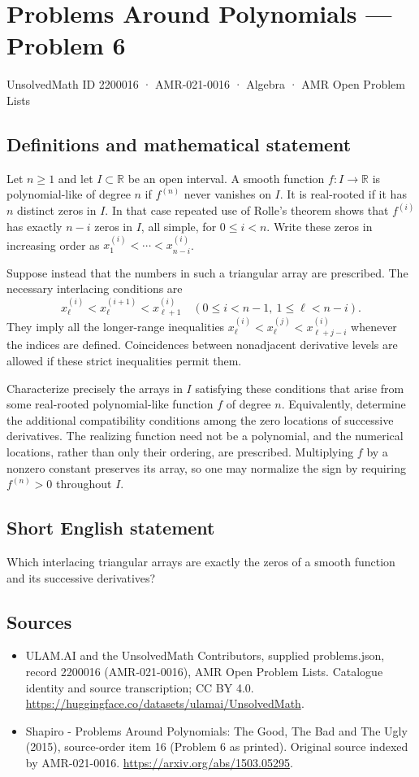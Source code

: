 \documentclass[11pt,a4paper]{article}
\begin{document}
\section*{Problems Around Polynomials — Problem 6}\label{2200016}
{\small UnsolvedMath ID 2200016 · AMR-021-0016 · Algebra · AMR Open Problem Lists}
\subsection{Definitions and mathematical statement}
Let $n\geq1$ and let $I\subset\mathbb R$ be an open interval.
A smooth function $f:I\to\mathbb R$ is polynomial-like of degree $n$
if $f^{(n)}$ never vanishes on $I$. It is real-rooted if it has
$n$ distinct zeros in $I$. In that case repeated use of Rolle's
theorem shows that $f^{(i)}$ has exactly $n-i$ zeros in $I$, all
simple, for $0\leq i<n$.
Write these zeros in increasing order as
$x^{(i)}_1<\cdots<x^{(i)}_{n-i}$.

Suppose instead that the numbers in such a triangular array are
prescribed. The necessary interlacing conditions are
\[
 x^{(i)}_\ell<x^{(i+1)}_\ell<x^{(i)}_{\ell+1}
 \quad(0\leq i<n-1,\ 1\leq\ell<n-i).
\]
They imply all the longer-range inequalities
$x^{(i)}_\ell<x^{(j)}_\ell<x^{(i)}_{\ell+j-i}$ whenever the indices
are defined. Coincidences between nonadjacent derivative levels are
allowed if these strict inequalities permit them.

Characterize precisely the arrays in $I$ satisfying these conditions
that arise from some real-rooted polynomial-like function $f$ of
degree $n$. Equivalently, determine the additional compatibility
conditions among the zero locations of successive derivatives.
The realizing function need not be a polynomial, and the numerical
locations, rather than only their ordering, are prescribed.
Multiplying $f$ by a nonzero constant preserves its array, so one
may normalize the sign by requiring $f^{(n)}>0$ throughout $I$.
\subsection{Short English statement}
Which interlacing triangular arrays are exactly the zeros of a smooth function and its successive derivatives?
\subsection{Sources}
\begin{itemize}
\item[S1] ULAM.AI and the UnsolvedMath Contributors, supplied problems.json, record 2200016 (AMR-021-0016), AMR Open Problem Lists. Catalogue identity and source transcription; CC BY 4.0.
\url{https://huggingface.co/datasets/ulamai/UnsolvedMath}.
\item[S2] Shapiro - Problems Around Polynomials: The Good, The Bad and The Ugly (2015), source-order item 16 (Problem 6 as printed). Original source indexed by AMR-021-0016.
\url{https://arxiv.org/abs/1503.05295}.
\end{itemize}
\end{document}
